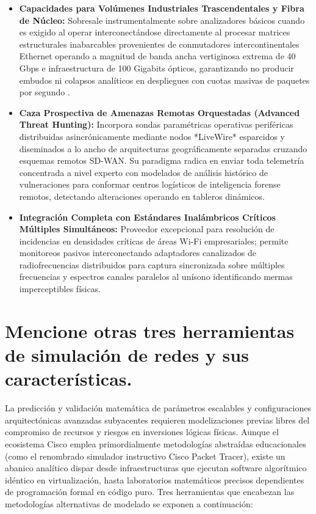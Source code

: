 \documentclass[a4paper,12pt]{article}
\begin{document}
\begin{itemize}
    \item \textbf{Capacidades para Volúmenes Industriales Trascendentales y Fibra de Núcleo:} Sobresale instrumentalmente sobre analizadores básicos cuando es exigido al operar interconectándose directamente al procesar matrices estructurales inabarcables provenientes de conmutadores intercontinentales Ethernet operando a magnitud de banda ancha vertiginosa extrema de 40 Gbps e infraestructura de 100 Gigabits ópticos, garantizando no producir embudos ni colapsos analíticos en despliegues con cuotas masivas de paquetes por segundo \cite{stallings2014}.
    \item \textbf{Caza Prospectiva de Amenazas Remotas Orquestadas (Advanced Threat Hunting):} Incorpora sondas paramétricas operativas periféricas distribuidas asincrónicamente mediante nodos *LiveWire* esparcidos y diseminados a lo ancho de arquitecturas geográficamente separadas cruzando esquemas remotos SD-WAN. Su paradigma radica en enviar toda telemetría concentrada a nivel experto con modelados de análisis histórico de vulneraciones para conformar centros logísticos de inteligencia forense remotos, detectando alteraciones operando en tableros dinámicos.
    \item \textbf{Integración Completa con Estándares Inalámbricos Críticos Múltiples Simultáneos:} Proveedor excepcional para resolución de incidencias en densidades críticas de áreas Wi-Fi empresariales; permite monitoreos pasivos interconectando adaptadores canalizados de radiofrecuencias distribuidos para captura sincronizada sobre múltiples frecuencias y espectros canales paralelos al unísono identificando mermas imperceptibles físicas.
\end{itemize}


\section{Mencione otras tres herramientas de simulación de redes y sus características.}

La predicción y validación matemática de parámetros escalables y configuraciones arquitectónicas avanzadas subyacentes requieren modelizaciones previas libres del compromiso de recursos y riesgos en inversiones lógicas físicas. Aunque el ecosistema Cisco emplea primordialmente metodologías abstraídas educacionales (como el renombrado simulador instructivo Cisco Packet Tracer), existe un abanico analítico dispar desde infraestructuras que ejecutan software algorítmico idéntico en virtualización, hasta laboratorios matemáticos precisos dependientes de programación formal en código puro. Tres herramientas que encabezan las metodologías alternativas de modelado se exponen a continuación:
\end{document}
